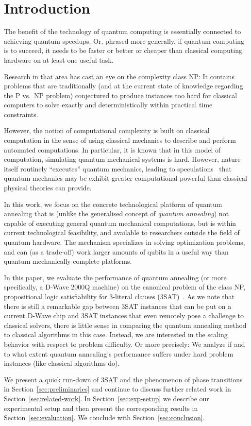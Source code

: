 \section{Introduction}

The benefit of the technology of quantum computing is essentially connected to achieving quantum speedups. Or, phrased more generally, if quantum computing is to succeed, it needs to be faster or better or cheaper than classical computing hardware on at least one useful task.

Research in that area has cast an eye on the complexity class NP: It contains problems that are traditionally (and at the current state of knowledge regarding the P vs.\ NP problem) conjectured to produce instances too hard for classical computers to solve exactly and deterministically within practical time constraints.

However, the notion of computational complexity is built on classical
computation in the sense of using classical mechanics to describe and
perform automated computations. In particular, it is known that in this
model of computation, simulating quantum mechanical systems is hard. However, nature itself routinely ``executes'' quantum mechanics, leading to
speculations~\cite{feynman1981simulating} that quantum mechanics may
be exhibit greater computational powerful than classical physical theories
can provide.

In this work, we focus on the concrete technological platform of quantum annealing that is (unlike the generalised concept of \emph{quantum annealing}) not capable of executing general quantum mechanical computations, but is within current technological feasibility, and available to researchers outside the field of quantum hardware. The mechanism specializes in solving optimization problems, and can (as a trade-off) work larger amounts of qubits in a useful way than quantum mechanically complete platforms.

In this paper, we evaluate the performance of quantum annealing (or more specifically, a D-Wave 2000Q machine) on the canonical problem of the class NP, propositional logic satisfiability for 3-literal clauses (3SAT)~\cite{cook1971complexity}. As we note that there is still a remarkable gap between 3SAT instances that can be put on a current D-Wave chip and 3SAT instances that even remotely pose a challenge to classical solvers, there is little sense in comparing the quantum annealing method to classical algorithms in this case. Instead, we are interested in the scaling behavior with respect to problem difficulty. Or more precisely: We analyze if and to what extent quantum annealing's performance suffers under hard problem instances (like classical algorithms do).

We present a quick run-down of 3SAT and the phenomenon of phase transitions in Section~\ref{sec:preliminaries} and continue to discuss further related work in Section~\ref{sec:related-work}. In Section~\ref{sec:exp-setup} we describe our experimental setup and then present the corresponding results in Section~\ref{sec:evaluation}. We conclude with Section~\ref{sec:conclusion}.

